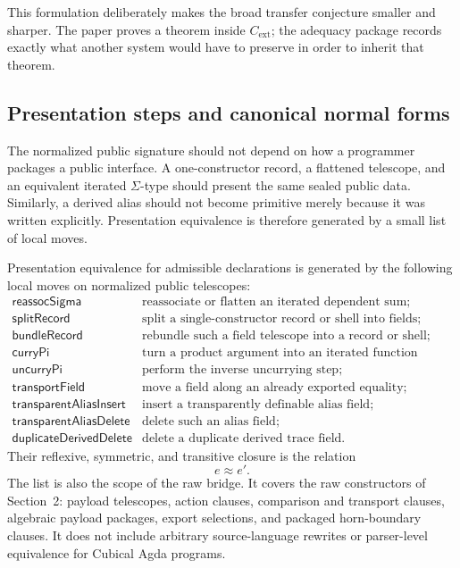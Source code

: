 \documentclass{lmcs}
\begin{document}
This formulation deliberately makes the broad transfer conjecture smaller and sharper.  The
paper proves a theorem inside \(C_{\mathrm{ext}}\); the adequacy package records exactly what
another system would have to preserve in order to inherit that theorem.


\subsection{Presentation steps and canonical normal forms}

The normalized public signature should not depend on how a programmer packages a public
interface.  A one-constructor record, a flattened telescope, and an equivalent iterated
\(\Sigma\)-type should present the same sealed public data.  Similarly, a derived alias should
not become primitive merely because it was written explicitly.  Presentation equivalence is
therefore generated by a small list of local moves.

\begin{defi}
Presentation equivalence for admissible declarations is generated by the following local
moves on normalized public telescopes:
\[
\begin{array}{ll}
\mathsf{reassocSigma} & \text{reassociate or flatten an iterated dependent sum;}\\
\mathsf{splitRecord} & \text{split a single-constructor record or shell into fields;}\\
\mathsf{bundleRecord} & \text{rebundle such a field telescope into a record or shell;}\\
\mathsf{curryPi} & \text{turn a product argument into an iterated function telescope;}\\
\mathsf{uncurryPi} & \text{perform the inverse uncurrying step;}\\
\mathsf{transportField} & \text{move a field along an already exported equality;}\\
\mathsf{transparentAliasInsert} & \text{insert a transparently definable alias field;}\\
\mathsf{transparentAliasDelete} & \text{delete such an alias field;}\\
\mathsf{duplicateDerivedDelete} & \text{delete a duplicate derived trace field.}
\end{array}
\]
Their reflexive, symmetric, and transitive closure is the relation
\[
  e \approx e'.
\]
The list is also the scope of the raw bridge.  It covers the raw constructors of
Section~2: payload telescopes, action clauses, comparison and transport clauses, algebraic
payload packages, export selections, and packaged horn-boundary clauses.  It does not include
arbitrary source-language rewrites or parser-level equivalence for Cubical Agda programs.
\end{defi}
\end{document}
